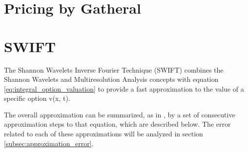 \documentclass[12,twoside]{mammeTFM}
\theoremstyle{definition}
\theoremstyle{remark}
\begin{document}
\section{Pricing by Gatheral}

\section{SWIFT}

The Shannon Wavelets Inverse Fourier Technique (SWIFT) combines the Shannon Wavelets and Multiresolution Analysis concepts with equation \ref{eq:integral_option_valuation} to provide a fast approximation to the value of a specific option v(x, t).

The overall approximation can be summarized, as in \cite{mar17}, by a set of consecutive approximation steps to that equation, which are described below. The error related to each of these approximations will be analyzed in section \ref{subsec:approximation_error}.
\end{document}
